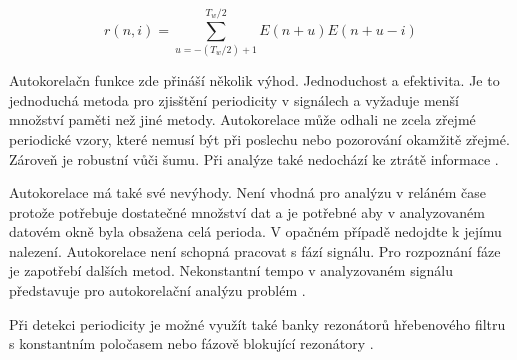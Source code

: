     \begin{equation}
      r(n,i) = \sum_{u = -(T_w / 2) + 1}^{T_w / 2} E(n+u)E(n+u-i)
      \label{rov:autocorelation}
    \end{equation}

    Autokorelačn funkce zde přináší několik výhod. Jednoduchost a efektivita. Je to jednoduchá metoda pro zjisštění periodicity v signálech a vyžaduje menší množství paměti než jiné metody. Autokorelace může odhali ne zcela zřejmé periodické vzory, které nemusí být při poslechu nebo pozorování okamžitě zřejmé. Zároveň je robustní vůči šumu. Při analýze také nedochází ke ztrátě informace \cite{Tempo_and_metrical_analzsis_by_tracking_multiple_metrical_levels_using_autocorrelation}.
    
    Autokorelace má také své nevýhody. Není vhodná pro analýzu v reláném čase protože potřebuje dostatečné množství dat a je potřebné aby v analyzovaném datovém okně byla obsažena celá perioda. V opačném případě nedojdte k jejímu nalezení. Autokorelace není schopná pracovat s fází signálu. Pro rozpoznání fáze je zapotřebí dalších metod. Nekonstantní tempo v analyzovaném signálu představuje pro autokorelační analýzu problém \cite{Tempo_and_metrical_analzsis_by_tracking_multiple_metrical_levels_using_autocorrelation}.

    Při detekci periodicity je možné využít také banky rezonátorů hřebenového filtru s konstantním poločasem \cite{Tempo_and_beat_analysis_of_acoustic_musical_signals} nebo fázově blokující rezonátory \cite{Resonance_and_the_perciption_of_musical_meter}.


  

